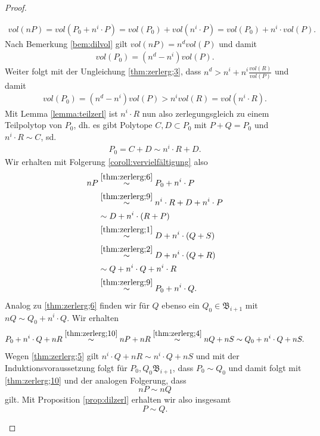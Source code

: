 \documentclass[11pt,titlepage]{article}
\theoremstyle{definition}
\theoremstyle{remark}
\begin{document}
\begin{proof}
\begin{itemize}
			\begin{align*}
			vol(nP)=vol(P_0+n^i\cdot P)=vol(P_0)+vol(n^i\cdot P)=vol(P_0)+
			n^i\cdot vol(P).
			\end{align*}
			Nach Bemerkung \ref{bem:dilvol} gilt $vol(nP)=n^d vol(P)$ und damit 
			\begin{align}
			vol(P_0)=(n^d -n^i)vol(P). \label{thm:zerlerg;7}
			\end{align}
			Weiter folgt mit der Ungleichung \ref{thm:zerlerg;3}, dass 
			$n^d > n^i+n^i\frac{vol(R)}{vol(P)}$ und damit
			\begin{align}
				vol(P_0)=(n^d -n^i)vol(P)>n^i vol(R)=vol(n^i\cdot R)\label{thm:zerlerg;8}.
			\end{align}
			Mit Lemma \ref{lemma:teilzerl} 
			ist $n^i\cdot R$ nun also zerlegungsgleich zu einem Teilpolytop von $P_0$, dh. es gibt Polytope $C,D\subset P_0$ mit $P+Q=P_0$ und $n^i\cdot R\sim C$, sd. 
			\begin{align}
			P_0=C+D\sim n^i\cdot R+D. \label{thm:zerlerg;9}
			\end{align}
			Wir erhalten mit Folgerung \ref{coroll:vervielfältigung} also
			\begin{align}
			nP &\overset{\ref{thm:zerlerg;6}}{\sim} P_0+n^i \cdot P \notag\\
			&\overset{\ref{thm:zerlerg;9}}{\sim} n^i\cdot R +D+n^i \cdot P \notag\\
			&\sim D+n^i\cdot(R+P) \notag\\ 
			&\overset{\ref{thm:zerlerg;1}}{\sim} D+n^i\cdot(Q+S) \notag\\
			&\overset{\ref{thm:zerlerg;2}}{\sim} D+n^i\cdot(Q+R) \notag\\
			&\sim Q+n^i\cdot Q +n^i\cdot R \notag\\
			&\overset{\ref{thm:zerlerg;9}}{\sim} P_0+n^i \cdot Q. \label{thm:zerlerg;10}
			\end{align}
			Analog zu \ref{thm:zerlerg;6} finden wir für $Q$ ebenso ein 
			$Q_0\in\mathfrak{B}_{i+1}$ mit $nQ\sim Q_0+n^i\cdot Q$. Wir erhalten 
			\[P_0+n^i\cdot Q+nR\overset{\ref{thm:zerlerg;10}}{\sim}
			nP+nR\overset{\ref{thm:zerlerg;4}}{\sim}nQ+nS\sim Q_0+n^i\cdot Q+nS.\]
			Wegen \ref{thm:zerlerg;5} gilt $n^i\cdot Q+nR\sim n^i\cdot Q +nS$ und 
			mit der Induktionsvoraussetzung folgt für $P_0,Q_0\mathfrak{B}_{i+1}
			$, dass 
			$P_0\sim Q_0$ und damit folgt mit \ref{thm:zerlerg;10} und der 
			analogen Folgerung, dass 
			\[nP\sim nQ\]
			gilt. Mit Proposition \ref{prop:dilzerl} erhalten wir also insgesamt 
			\[P\sim Q.\]
		\end{itemize}
	\end{proof}
	
\end{document}
